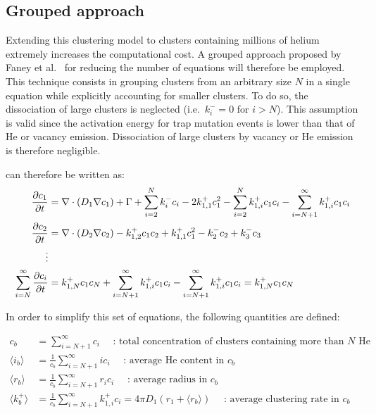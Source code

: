 \subsection{Grouped approach}
Extending this clustering model to clusters containing millions of helium extremely increases the computational cost.
A grouped approach proposed by Faney et al.\  for reducing the number of equations will therefore be employed.
This technique consists in grouping clusters from an arbitrary size $N$ in a single equation while explicitly accounting for smaller clusters.
To do so, the dissociation of large clusters is neglected (i.e.\ $k_i^- = 0$ for $i>N$).
This assumption is valid since the activation energy for \gls{trap mutation} events is lower than that of He or \gls{vacancy} emission.
Dissociation of large clusters by \gls{vacancy} or He emission is therefore negligible.

 can therefore be written as:
\begin{subequations}
    \begin{align}
        \frac{\partial c_1}{\partial t} &= \nabla \cdot (D_1 \nabla c_1) + \Gamma + \sum\limits_{i=2}^N k_{i}^- c_i - 2k_{1, 1}^+ c_1^2 - \sum\limits_{i=2}^N k_{1,i}^+ c_1 c_i - \sum\limits_{i=N+1}^\infty k_{1,i}^+ c_1 c_i \\
        \frac{\partial c_2}{\partial t} &= \nabla \cdot (D_2 \nabla c_2) - k_{1, 2}^+ c_1 c_2 + k_{1, 1}^+ c_1^2 - k_{2}^- c_2 + k_{3}^- c_3\\
        \vdots \nonumber\\
        \sum\limits_{i=N}^\infty \frac{\partial c_{i}}{\partial t} &= k_{1, N}^+ c_1 c_N + \sum\limits_{i=N+1}^\infty k_{1, i}^+ c_1 c_i - \sum\limits_{i=N+1}^\infty k_{1, i}^+ c_1 c_i = k_{1, N}^+ c_1 c_N
    \end{align}
    \labeq{temporal evolution grouping no new symbols}
\end{subequations}

In order to simplify this set of equations, the following quantities are defined:

\begin{align}
    c_b &= \sum\limits_{i=N+1}^\infty c_i \quad \text{ : total concentration of clusters containing more than $N$ He} \\
    \langle i_b \rangle &= \frac{1}{c_b} \sum\limits_{i=N+1}^\infty i c_i \quad \text{ : average He content in $c_b$} \\
    \langle r_b \rangle &=  \frac{1}{c_b}\sum\limits_{i=N+1}^\infty r_i c_i \quad \text{ : average radius in $c_b$}\\
    \langle k_b^+ \rangle &=  \frac{1}{c_b}\sum\limits_{i=N+1}^\infty k_{1,i}^+ c_i = 4 \pi D_1 (r_1 + \langle r_b \rangle) \quad \text{ : average clustering rate in $c_b$}
\end{align}

